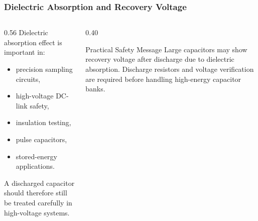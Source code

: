 \begin{frame}
\frametitle{Dielectric Absorption and Recovery Voltage}
\begin{columns}
\begin{column}{0.56\textwidth}
Dielectric absorption effect is important in:
\begin{itemize}
    \item precision sampling circuits,
    \item high-voltage DC-link safety,
    \item insulation testing,
    \item pulse capacitors,
    \item stored-energy applications.
\end{itemize}
A discharged capacitor should therefore still be treated carefully in high-voltage systems.
\end{column}

\begin{column}{0.40\textwidth}
\begin{block}{Practical Safety Message}
\small
Large capacitors may show recovery voltage after discharge due to dielectric absorption. Discharge resistors and voltage verification are required before handling high-energy capacitor banks.
\end{block}
\end{column}
\end{columns}
\end{frame}


